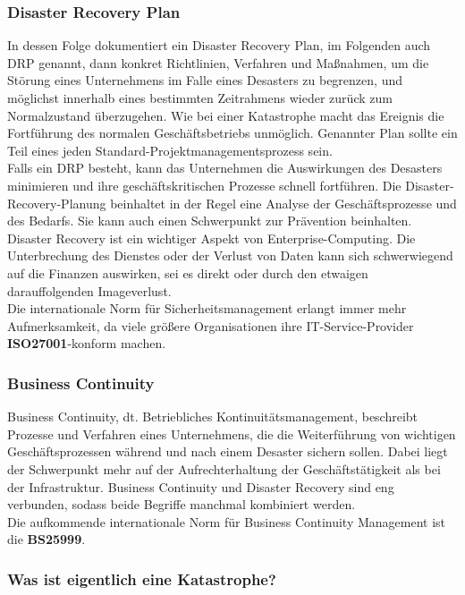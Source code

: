\documentclass[letterpaper, 12pt]{article}
\let\tempsubsubsection\subsubsection
\renewcommand\subsubsection[1]{\vspace{0cm}\tempsubsubsection{#1}\vspace{0cm}}
\begin{document}
\subsubsection{Disaster Recovery Plan}

In dessen Folge dokumentiert ein Disaster Recovery Plan, im Folgenden auch DRP genannt, dann konkret Richtlinien, Verfahren und Maßnahmen, um die Störung eines Unternehmens im Falle eines Desasters zu begrenzen, und möglichst innerhalb eines bestimmten Zeitrahmens wieder zurück zum Normalzustand überzugehen. Wie bei einer Katastrophe macht das Ereignis die Fortführung des normalen Geschäftsbetriebs unmöglich. Genannter Plan sollte ein Teil eines jeden Standard-Projektmanagementsprozess sein. \\
Falls ein DRP besteht, kann das Unternehmen die Auswirkungen des Desasters minimieren und ihre geschäftskritischen Prozesse schnell fortführen. Die Disaster-Recovery-Planung beinhaltet in der Regel eine Analyse der Geschäftsprozesse und des Bedarfs. Sie kann auch einen Schwerpunkt zur Prävention beinhalten. Disaster Recovery ist ein wichtiger Aspekt von Enterprise-Computing. Die Unterbrechung des Dienstes oder der Verlust von Daten kann sich schwerwiegend auf die Finanzen auswirken, sei es direkt oder durch den etwaigen darauffolgenden Imageverlust. \\
Die internationale Norm für Sicherheitsmanagement erlangt immer mehr Aufmerksamkeit, da viele größere Organisationen ihre IT-Service-Provider \textbf{ISO27001}-konform machen.

\newpage

\subsubsection{Business Continuity}

Business Continuity, dt. Betriebliches Kontinuitätsmanagement, beschreibt Prozesse und Verfahren eines Unternehmens, die die Weiterführung von wichtigen Geschäftsprozessen während und nach einem Desaster sichern sollen. Dabei liegt der Schwerpunkt mehr auf der Aufrechterhaltung der Geschäftstätigkeit als bei der Infrastruktur. Business Continuity und Disaster Recovery sind eng verbunden, sodass beide Begriffe manchmal kombiniert werden. \\
Die aufkommende internationale Norm für Business Continuity Management ist die \textbf{BS25999}. \\

\subsubsection{Was ist eigentlich eine Katastrophe?}
\end{document}
